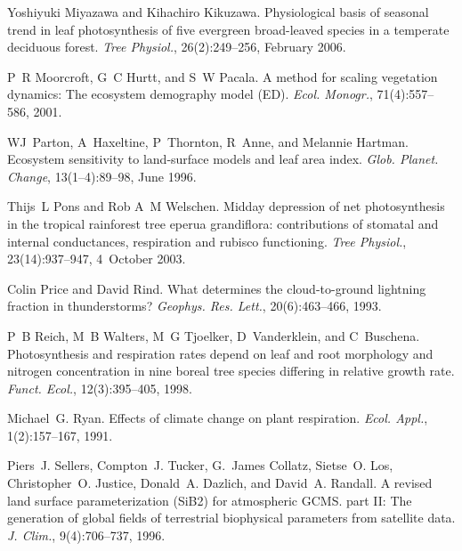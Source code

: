 \begin{DoxyDescription}
\item[\label{_CITEREF_Miyazawa2006-so}%
\mbox{[}39\mbox{]}]Yoshiyuki Miyazawa and Kihachiro Kikuzawa. Physiological basis of seasonal trend in leaf photosynthesis of five evergreen broad-\/leaved species in a temperate deciduous forest. {\itshape Tree Physiol.}, 26(2)\+:249--256, February 2006.


\item[\label{_CITEREF_Moorcroft2001-co}%
\mbox{[}40\mbox{]}]P~R Moorcroft, G~C Hurtt, and S~W Pacala. A method for scaling vegetation dynamics\+: The ecosystem demography model (E\+D). {\itshape Ecol. Monogr.}, 71(4)\+:557--586, 2001. 


\item[\label{_CITEREF_Parton1996-zv}%
\mbox{[}41\mbox{]}]W\+J~Parton, A~Haxeltine, P~Thornton, R~Anne, and Melannie Hartman. Ecosystem sensitivity to land-\/surface models and leaf area index. {\itshape Glob. Planet. Change}, 13(1–4)\+:89--98, June 1996. 


\item[\label{_CITEREF_Pons2003-f26}%
\mbox{[}42\mbox{]}]Thijs~L Pons and Rob A~M Welschen. Midday depression of net photosynthesis in the tropical rainforest tree eperua grandiflora\+: contributions of stomatal and internal conductances, respiration and rubisco functioning. {\itshape Tree Physiol.}, 23(14)\+:937--947, 4~October 2003.


\item[\label{_CITEREF_Price1993-fm}%
\mbox{[}43\mbox{]}]Colin Price and David Rind. What determines the cloud-\/to-\/ground lightning fraction in thunderstorms? {\itshape Geophys. Res. Lett.}, 20(6)\+:463--466, 1993. 


\item[\label{_CITEREF_Reich1998-zr}%
\mbox{[}44\mbox{]}]P~B Reich, M~B Walters, M~G Tjoelker, D~Vanderklein, and C~Buschena. Photosynthesis and respiration rates depend on leaf and root morphology and nitrogen concentration in nine boreal tree species differing in relative growth rate. {\itshape Funct. Ecol.}, 12(3)\+:395--405, 1998. 


\item[\label{_CITEREF_Ryan1991-ai}%
\mbox{[}45\mbox{]}]Michael~G. Ryan. Effects of climate change on plant respiration. {\itshape Ecol. Appl.}, 1(2)\+:157--167, 1991. 


\item[\label{_CITEREF_Sellers1996-bh}%
\mbox{[}46\mbox{]}]Piers~J. Sellers, Compton~J. Tucker, G.~James Collatz, Sietse~O. Los, Christopher~O. Justice, Donald~A. Dazlich, and David~A. Randall. A revised land surface parameterization (Si\+B2) for atmospheric G\+C\+M\+S. part I\+I\+: The generation of global fields of terrestrial biophysical parameters from satellite data. {\itshape J. Clim.}, 9(4)\+:706--737, 1996. 



\end{DoxyDescription}
